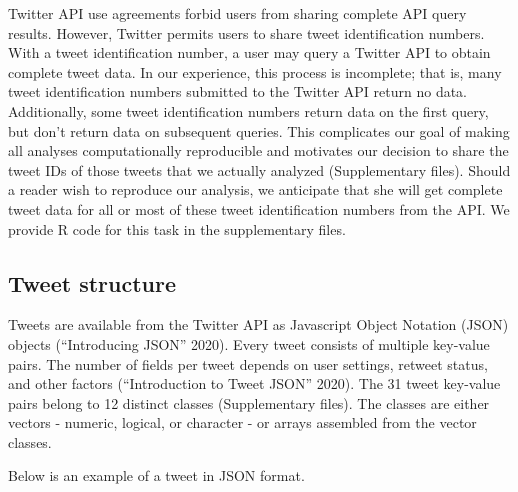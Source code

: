 \documentclass[
]{article}
\begin{document}
Twitter API use agreements forbid users from sharing complete API query results.
However, Twitter permits users to share tweet identification numbers. With a tweet
identification number, a user may query a Twitter API to obtain complete tweet data. In our
experience, this
process is incomplete; that is, many tweet identification numbers submitted to the Twitter API return
no data. Additionally, some tweet identification numbers return data on the first query, but don't return data on subsequent queries. This complicates our goal of making all analyses computationally
reproducible and motivates our decision to share the tweet IDs of those tweets that
we actually analyzed (Supplementary files). Should a reader wish to reproduce
our analysis, we anticipate that she will get complete tweet data
for all or most of these tweet identification numbers from the API. We provide
R code for this task in the supplementary files.

\hypertarget{tweet-structure}{%
\subsection{Tweet structure}\label{tweet-structure}}

Tweets are available from the Twitter API as Javascript Object Notation (JSON) objects (``Introducing JSON'' 2020).
Every tweet consists
of multiple key-value pairs. The number of fields per
tweet depends on user settings, retweet status, and other factors (``Introduction to Tweet JSON'' 2020).
The 31 tweet key-value pairs belong to
12 distinct classes (Supplementary files). The
classes are either vectors - numeric, logical, or character - or arrays assembled
from the vector classes.

Below is an example of a tweet in JSON format.
\end{document}
